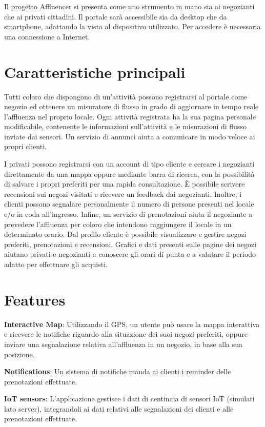 \documentclass[a4paper]{report}
\begin{document}
Il progetto Affluencer si presenta come uno strumento in mano sia ai negozianti che ai privati cittadini.
%
Il portale sarà accessibile sia da desktop che da smartphone, adattando la vista al dispositivo utilizzato.
%
Per accedere è necessaria una connessione a Internet.

\section{Caratteristiche principali}

Tutti coloro che dispongono di un'attività possono registrarsi al portale come negozio ed ottenere un misuratore di flusso in grado di aggiornare in tempo reale l'affluenza nel proprio locale.
%
Ogni attività registrata ha la sua pagina personale modificabile, contenente le informazioni sull’attività e le misurazioni di flusso inviate dai sensori.
%
Un servizio di annunci aiuta a comunicare in modo veloce ai propri clienti.

I privati possono registrarsi con un account di tipo cliente e cercare i negozianti direttamente da una mappa oppure mediante barra di ricerca, con la possibilità di salvare i propri preferiti per una rapida consultazione.
%
È possibile scrivere recensioni sui negozi visitati e ricevere un feedback dai negozianti.
%
Inoltre, i clienti possono segnalare personalmente il numero di persone presenti nel locale e/o in coda all'ingresso.
%
Infine, un servizio di prenotazioni aiuta il negoziante a prevedere l'affluenza per coloro che intendono raggiungere il locale in un determinato orario.
%
Dal profilo cliente è possibile visualizzare e gestire negozi preferiti, prenotazioni e recensioni.
%
Grafici e dati presenti sulle pagine dei negozi aiutano privati e negozianti a conoscere gli orari di punta e a valutare il periodo adatto per effettuare gli acquisti.

\section{Features}

\textbf{Interactive Map}: Utilizzando il GPS, un utente può usare la mappa interattiva e ricevere le notifiche riguardo alla situazione dei suoi negozi preferiti, oppure inviare una segnalazione relativa all’affluenza in un negozio, in base alla sua posizione.
%

\textbf{Notifications}: Un sistema di notifiche manda ai clienti i reminder delle prenotazioni effettuate.
%

\textbf{IoT sensors}: L’applicazione gestisce i dati di centinaia di sensori IoT (simulati lato server), integrandoli ai dati relativi alle segnalazioni dei clienti e alle prenotazioni effettuate.
%
\end{document}
